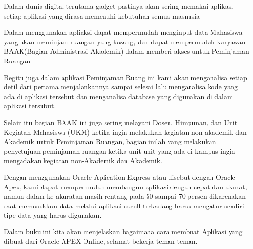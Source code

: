 \par Dalam dunia digital terutama gadget pastinya akan sering memakai aplikasi setiap aplikasi yang dirasa memenuhi kebutuhan semua masnusia 

\par Dalam menggunakan apliaksi dapat mempermudah menginput data Mahasiswa yang akan meminjam ruangan yang kosong, dan dapat mempermudah karyawan BAAK(Bagian Administrasi Akademik) dalam memberi akses untuk Peminjaman Ruangan

\par Begitu juga dalam aplikasi Peminjaman Ruang ini kami akan menganalisa setiap detil dari pertama menjalankannya sampai selesai lalu menganalisa kode yang ada di aplikasi tersebut dan menganalisa database yang digunakan di dalam aplikasi tersubut.

\par Selain itu bagian BAAK ini juga sering melayani Dosen, Himpunan, dan Unit Kegiatan Mahasiswa (UKM) ketika ingin melakukan kegiatan non-akademik dan Akademik untuk Peminjaman Ruangan, bagian inilah yang melakukan penyetujuan peminjaman ruangan ketika unit-unit yang ada di kampus ingin mengadakan kegiatan non-Akademik dan Akademik.

\par Dengan menggunakan Oracle Aplication Express atau disebut dengan Oracle Apex, kami dapat mempermudah membangun aplikasi dengan cepat dan akurat, namun dalam ke-akuratan masih rentang pada 50 sampai 70 persen dikarenakan saat memasukkan data melalui aplikasi excell terkadang harus mengatur sendiri tipe data yang harus digunakan.

\par Dalam buku ini kita akan menjelaskan bagaimana cara membuat Aplikasi yang dibuat dari Oracle APEX Online, selamat bekerja teman-teman.





